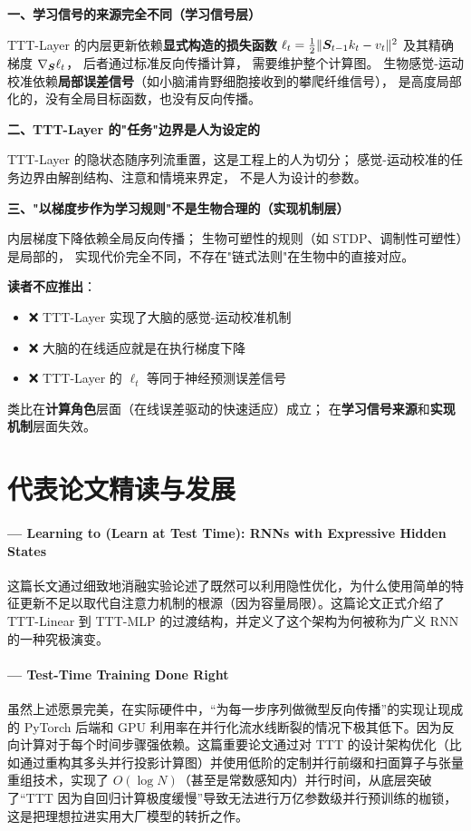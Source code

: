 \begin{analogyboundarybox}[title=这个类比在哪里失效]
\textbf{一、学习信号的来源完全不同（学习信号层）}

TTT-Layer 的内层更新依赖\textbf{显式构造的损失函数}
$\ell_t = \tfrac{1}{2}\|\boldsymbol{S}_{t-1}k_t - v_t\|^2$
及其精确梯度 $\nabla_{\boldsymbol{S}} \ell_t$，
后者通过标准反向传播计算，
需要维护整个计算图。
生物感觉-运动校准依赖\textbf{局部误差信号}（如小脑浦肯野细胞接收到的攀爬纤维信号），
是高度局部化的，没有全局目标函数，也没有反向传播。

\textbf{二、TTT-Layer 的"任务"边界是人为设定的}

TTT-Layer 的隐状态随序列流重置，这是工程上的人为切分；
感觉-运动校准的任务边界由解剖结构、注意和情境来界定，
不是人为设计的参数。

\textbf{三、"以梯度步作为学习规则"不是生物合理的（实现机制层）}

内层梯度下降依赖全局反向传播；
生物可塑性的规则（如 STDP、调制性可塑性）是局部的，
实现代价完全不同，不存在"链式法则"在生物中的直接对应。

\textbf{读者不应推出}：
\begin{itemize}
  \item ❌ TTT-Layer 实现了大脑的感觉-运动校准机制
  \item ❌ 大脑的在线适应就是在执行梯度下降
  \item ❌ TTT-Layer 的 $\ell_t$ 等同于神经预测误差信号
\end{itemize}

类比在\textbf{计算角色}层面（在线误差驱动的快速适应）成立；
在\textbf{学习信号来源}和\textbf{实现机制}层面失效。
\end{analogyboundarybox}

\section{代表论文精读与发展}
\label{sec:ttt_layers_papers}

\paragraph{\citet{sun2024learning} — Learning to (Learn at Test Time): RNNs with Expressive Hidden States}
这篇长文通过细致地消融实验论述了既然可以利用隐性优化，为什么使用简单的特征更新不足以取代自注意力机制的根源（因为容量局限）。这篇论文正式介绍了 TTT-Linear 到 TTT-MLP 的过渡结构，并定义了这个架构为何被称为广义 RNN 的一种究极演变。

\paragraph{\citet{anonymous2025tttdone} — Test-Time Training Done Right}
虽然上述愿景完美，在实际硬件中，“为每一步序列做微型反向传播”的实现让现成的 PyTorch 后端和 GPU 利用率在并行化流水线断裂的情况下极其低下。因为反向计算对于每个时间步骤强依赖。这篇重要论文通过对 TTT 的设计架构优化（比如通过重构其多头并行投影计算图）并使用低阶的定制并行前缀和扫面算子与张量重组技术，实现了 $O(\log N)$（甚至是常数感知内）并行时间，从底层突破了“TTT 因为自回归计算极度缓慢”导致无法进行万亿参数级并行预训练的枷锁，这是把理想拉进实用大厂模型的转折之作。

